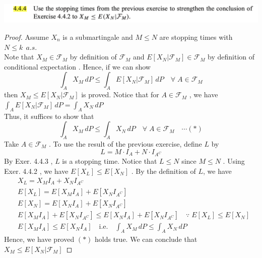\documentclass[12pt, A4]{article}
\newcommand{\F}{\mathcal{F}}
\begin{document}
\includegraphics[width=17cm]{Exer4.4.4.png}
\begin{proof}
    Assume $X_n$ is a submartingale and $M\leq N$ are stopping times with $N\leq k\;\,a.s.$ \\ Note that $X_M\in \F_M$ by definition of $\F_M$ and $E[X_N|\F_M]\in \F_M$ by definition of conditional expectation . Hence, if we can show $$\int_A X_M\, dP\leq \int_A E[X_N|\F_M]\, dP \quad \forall \; A\in \F_M$$ then $X_M\leq E[X_N|\F_M]$ is proved. Notice that for $A\in \F_M$ , we have $\int_A E[X_N|\F_M]\, dP=\int_A X_N\, dP$ \\ Thus, it suffices to show that $$\int_A X_M\,dP\leq \int_A X_N\, dP\quad \forall\; A\in \F_M \quad \cdots (*)$$
    Take $A\in \F_M$ . To use the result of the previous exercise, define $L$ by $$L=M\cdot I_A + N\cdot I_{A^C} $$ 
    By Exer. 4.4.3 , $L$ is a stopping time. Notice that $L\leq N$ since $M\leq N$ . Using Exer. 4.4.2 , we have $E[X_L]\leq E[X_N]$ . By the definition of $L$, we have 
    \begin{align*}
        &X_L=X_MI_A+X_NI_{A^C} \\
        &E[X_L] = E[X_MI_A]+E[X_NI_{A^C}] \\
        &E[X_N] = E[X_NI_A]+E[X_NI_{A^C}] \\
        &E[X_MI_A]+E[X_NI_{A^C}]\leq E[X_NI_A]+E[X_NI_{A^C}] \quad \because \; E[X_L]\leq E[X_N] \\
        &E[X_MI_A]\leq E[X_NI_A] \quad \text{i.e.} \quad \int_A X_M\,dP\leq \int_A X_N\, dP
    \end{align*}
    Hence, we have proved $(*)$ holds true. We can conclude that $X_M\leq E[X_N|\F_M]$
\end{proof}
\vspace{1cm}
\end{document}
